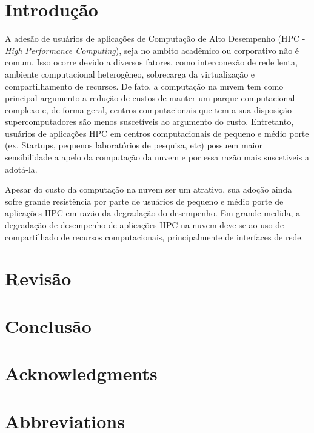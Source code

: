 \documentclass[11pt, titlepage]{article}
\begin{document}
\section{Introdução}
\label{MPSection:44EB7A3A-0A0A-4C54-8447-1F6D5347559F}

A adesão de usuários de aplicações de Computação de Alto Desempenho (HPC - \emph{High Performance Computing}), seja no ambito acadêmico ou corporativo não é comum. Isso ocorre devido a diversos fatores, como interconexão de rede lenta, ambiente computacional heterogêneo, sobrecarga da virtualização e compartilhamento de recursos. De fato, a computação na nuvem tem como principal argumento a redução de custos de manter um parque computacional complexo e, de forma geral, centros computacionais que tem a sua disposição supercomputadores são menos suscetíveis ao argumento do custo. Entretanto, usuários de aplicações HPC em centros computacionais de pequeno e médio porte (ex. Startups, pequenos laboratórios de pesquisa, etc) possuem maior sensibilidade a apelo da computação da nuvem e por essa razão mais suscetiveis a adotá-la.

Apesar do custo da computação na nuvem ser um atrativo, sua adoção ainda sofre grande resistência por parte de usuários de pequeno e médio porte de aplicações HPC em razão da degradação do desempenho. Em grande medida, a degradação de desempenho de aplicações HPC na nuvem deve-se ao uso de compartilhado de recursos computacionais, principalmente de interfaces de rede.



\section{Revisão}
\label{MPSection:FA9A33D4-490F-406D-84E8-2BDA22A0F52D}



\section{Conclusão}
\label{MPSection:E3D67007-0EDE-487B-B714-6F004A58F4A3}



\section{Acknowledgments}
\label{MPSection:640E517E-5F30-41FD-9883-196E5C5C4E6E}



\section{Abbreviations}
\label{MPSection:5197A5CC-52DA-496F-A40D-274D59C80533}
\end{document}
